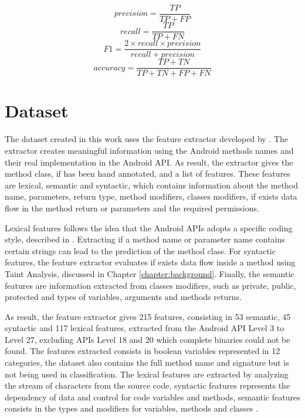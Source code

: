 \begin{multicols}{2}%
    \noindent%
    {%
    \begin{equation} \label{precision} precision = \frac{TP}{TP+FP} \end{equation}%
    \begin{equation} \label{recall} recall = \frac{TP}{TP+FN} \end{equation}%
    }%
    {%
    \begin{equation} \label{f1} F1 = \frac{2 \times recall \times precision}{recall + precision} \end{equation}%
    \begin{equation} \label{accuracy} accuracy = \frac{TP+TN}{TP+TN+FP+FN} \end{equation}%
    }%
\end{multicols}

\section{Dataset}\label{dset_section}

The dataset created in this work uses the feature extractor developed by \cite{rasthofer2014machine}. The extractor creates meaningful information using the Android methods names and their real implementation in the Android API. As result, the extractor gives the method class, if has been hand annotated, and a list of features. These features are lexical, semantic and syntactic, which contains information about the method name, parameters, return type, method modifiers, classes modifiers, if exists data flow in the method return or parameters and the required permissions.

Lexical features follows the idea that the Android APIs adopts a specific coding style, described in \cite{androidcoderef}. Extracting if a method name or parameter name contains certain strings can lead to the prediction of the method class. For syntactic features, the feature extractor evaluates if exists data flow inside a method using Taint Analysis, discussed in Chapter \ref{chapter:background}. Finally, the semantic features are information extracted from classes modifiers, such as private, public, protected and types of variables, arguments and methods returns.

As result, the feature extractor gives 215 features, consisting in 53 semantic, 45 syntactic and 117 lexical features, extracted from the Android API Level 3 to Level 27, excluding APIs Level 18 and 20 which complete binaries could not be found. The features extracted consists in boolean variables represented in 12 categories, the dataset also contains the full method name and signature but is not being used in classification. The lexical features are extracted by analyzing the stream of characters from the source code, syntactic features represents the dependency of data and control for code variables and methods, semantic features consists in the types and modifiers for variables, methods and classes \cite{aho2003compilers}.

